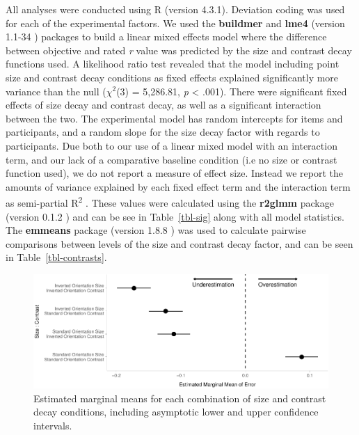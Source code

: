 \documentclass[manuscript, review, anonymous, screen]{acmart}
\begin{document}
All analyses were conducted using R (version 4.3.1). Deviation coding
was used for each of the experimental factors. We used the
\textbf{buildmer} and \textbf{lme4} (version 1.1-34 \citep{lme4})
packages to build a linear mixed effects model where the difference
between objective and rated \emph{r} value was predicted by the size and
contrast decay functions used. A likelihood ratio test revealed that the
model including point size and contrast decay conditions as fixed
effects explained significantly more variance than the null
(\(\chi^2\)(3) = 5,286.81, \emph{p} \textless{} .001). There were
significant fixed effects of size decay and contrast decay, as well as a
significant interaction between the two. The experimental model has
random intercepts for items and participants, and a random slope for the
size decay factor with regards to participants. Due both to our use of a
linear mixed model with an interaction term, and our lack of a
comparative baseline condition (i.e no size or contrast function used),
we do not report a measure of effect size. Instead we report the amounts
of variance explained by each fixed effect term and the interaction term
as semi-partial R\textsuperscript{2} \citep{nakagawa_2013}. These values
were calculated using the \textbf{r2glmm} package (version 0.1.2
\citep{r2glmm}) and can be see in Table~\ref{tbl-sig} along with all
model statistics. The \textbf{emmeans} package (version 1.8.8
\citep{emmeans}) was used to calculate pairwise comparisons between
levels of the size and contrast decay factor, and can be seen in
Table~\ref{tbl-contrasts}.

\begin{figure}

{\centering \includegraphics[width=1\textwidth,height=\textheight]{size_and_contrast_files/figure-pdf/fig-emm-plot-1.pdf}

}

\caption{\label{fig-emm-plot}Estimated marginal means for each
combination of size and contrast decay conditions, including asymptotic
lower and upper confidence intervals.}

\end{figure}
\end{document}
